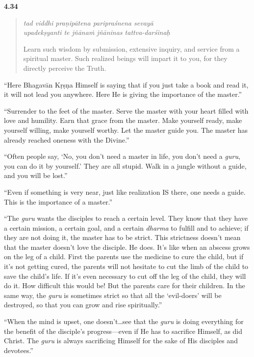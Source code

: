 \par\noindent\textbf{4.34}\par
\begin{verse}
\textit{tad viddhi praṇipātena paripraśnena sevayā} \\
\textit{upadekṣyanti te jñānaṁ jñāninas tattva-darśinaḥ}

\noindent Learn such wisdom by submission, extensive inquiry, and service from a spiritual master. Such realized beings will impart it to you, for they directly perceive the Truth.
\end{verse}
\par


\enquote{Here Bhagavān Kṛṣṇa Himself is saying that if you just take a book and read it, it will not lead you anywhere. Here He is giving the importance of the master.}

\enquote{Surrender to the feet of the master. Serve the master with your heart filled with love and humility. Earn that grace from the master. Make yourself ready, make yourself willing, make yourself worthy. Let the master guide you. The master has already reached oneness with the Divine.}

\enquote{Often people say, \enquote{No, you don’t need a master in life, you don’t need a \textit{guru}, you can do it by yourself.} They are all stupid. Walk in a jungle without a guide, and you will be lost.}

\enquote{Even if something is very near, just like realization IS there, one needs a guide. This is the importance of a master.}

\enquote{The \textit{guru} wants the disciples to reach a certain level. They know that they have a certain mission, a certain goal, and a certain \textit{dharma} to fulfill and to achieve; if they are not doing it, the master has to be strict. This strictness doesn’t mean that the master doesn’t love the disciple. He does. It’s like when an abscess grows on the leg of a child. First the parents use the medicine to cure the child, but if it’s not getting cured, the parents will not hesitate to cut the limb of the child to save the child’s life. If it’s even necessary to cut off the leg of the child, they will do it. How difficult this would be! But the parents care for their children. In the same way, the \textit{guru} is sometimes strict so that all the \enquote{evil-doers} will be destroyed, so that you can grow and rise spiritually.}

\enquote{When the mind is upset, one doesn’t\ldots see that the \textit{guru} is doing everything for the benefit of the disciple’s progress---even if He has to sacrifice Himself, as did Christ. The \textit{guru} is always sacrificing Himself for the sake of His disciples and devotees.}

